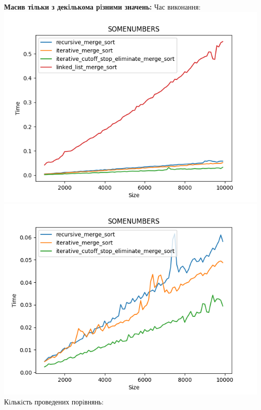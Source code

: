 \documentclass{article}
\begin{document}
        \newpage
        \textbf{Масив тільки з декiлькома рiзними значень:}
        \newline
        Час виконання:
        \newline
            \includegraphics[scale=0.5]{somenumbers_Time_4_sorts_90_numbers_50.png}
            \includegraphics[scale=0.5]{somenumbers_Time_3_sorts_90_numbers_50.png}
        \newline
        Кiлькiсть проведених порiвнянь:
        \newline
\end{document}
